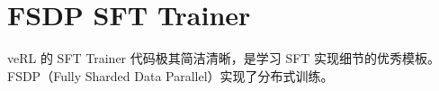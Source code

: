 \section{FSDP SFT Trainer}
veRL 的 SFT Trainer 代码极其简洁清晰，是学习 SFT 实现细节的优秀模板。FSDP（Fully Sharded Data Parallel）实现了分布式训练。

